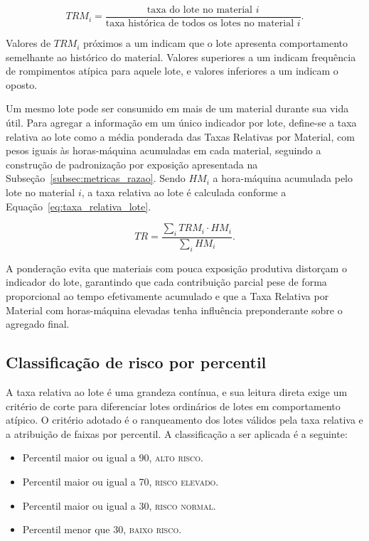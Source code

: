 \begin{equation}
TRM_i = \frac{\text{taxa do lote no material } i}{\text{taxa histórica de todos os lotes no material } i}.
\label{eq:trm}
\end{equation}
\vspace{0.4em}

Valores de $TRM_i$ próximos a um indicam que o lote apresenta comportamento semelhante ao histórico do material. Valores superiores a um indicam frequência de rompimentos atípica para aquele lote, e valores inferiores a um indicam o oposto.

Um mesmo lote pode ser consumido em mais de um material durante sua vida útil. Para agregar a informação em um único indicador por lote, define-se a taxa relativa ao lote como a média ponderada das Taxas Relativas por Material, com pesos iguais às horas-máquina acumuladas em cada material, seguindo a construção de padronização por exposição apresentada na Subseção~\ref{subsec:metricas_razao}. Sendo $HM_i$ a hora-máquina acumulada pelo lote no material $i$, a taxa relativa ao lote é calculada conforme a Equação~\ref{eq:taxa_relativa_lote}.

\begin{equation}
TR = \frac{\sum_i TRM_i \cdot HM_i}{\sum_i HM_i}.
\label{eq:taxa_relativa_lote}
\end{equation}
\vspace{0.4em}

A ponderação evita que materiais com pouca exposição produtiva distorçam o indicador do lote, garantindo que cada contribuição parcial pese de forma proporcional ao tempo efetivamente acumulado e que a Taxa Relativa por Material com horas-máquina elevadas tenha influência preponderante sobre o agregado final.


\subsection{Classificação de risco por percentil}
\label{subsec:percentil_risco}

A taxa relativa ao lote é uma grandeza contínua, e sua leitura direta exige um critério de corte para diferenciar lotes ordinários de lotes em comportamento atípico. O critério adotado é o ranqueamento dos lotes válidos pela taxa relativa e a atribuição de faixas por percentil. A classificação a ser aplicada é a seguinte:

\begin{itemize}
    \item Percentil maior ou igual a 90, \textsc{alto risco}.
    \item Percentil maior ou igual a 70, \textsc{risco elevado}.
    \item Percentil maior ou igual a 30, \textsc{risco normal}.
    \item Percentil menor que 30, \textsc{baixo risco}.
\end{itemize}

